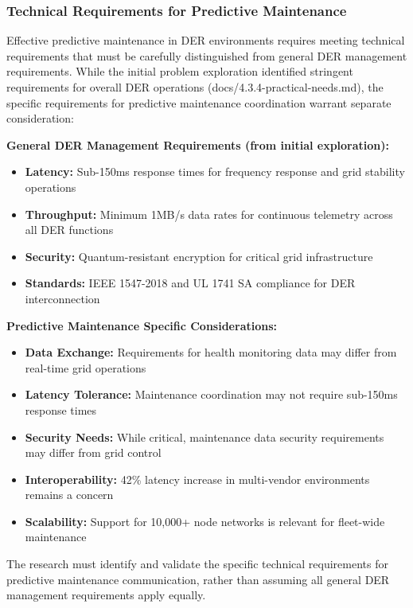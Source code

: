 \subsubsection{Technical Requirements for Predictive Maintenance}

Effective predictive maintenance in DER environments requires meeting technical requirements that must be carefully distinguished from general DER management requirements. While the initial problem exploration identified stringent requirements for overall DER operations (docs/4.3.4-practical-needs.md), the specific requirements for predictive maintenance coordination warrant separate consideration:

\textbf{General DER Management Requirements (from initial exploration):}
\begin{itemize}
\item \textbf{Latency:} Sub-150ms response times for frequency response and grid stability operations
\item \textbf{Throughput:} Minimum 1MB/s data rates for continuous telemetry across all DER functions
\item \textbf{Security:} Quantum-resistant encryption for critical grid infrastructure
\item \textbf{Standards:} IEEE 1547-2018 and UL 1741 SA compliance for DER interconnection
\end{itemize}

\textbf{Predictive Maintenance Specific Considerations:}
\begin{itemize}
\item \textbf{Data Exchange:} Requirements for health monitoring data may differ from real-time grid operations
\item \textbf{Latency Tolerance:} Maintenance coordination may not require sub-150ms response times
\item \textbf{Security Needs:} While critical, maintenance data security requirements may differ from grid control
\item \textbf{Interoperability:} 42\% latency increase in multi-vendor environments remains a concern
\item \textbf{Scalability:} Support for 10,000+ node networks is relevant for fleet-wide maintenance
\end{itemize}

The research must identify and validate the specific technical requirements for predictive maintenance communication, rather than assuming all general DER management requirements apply equally.

